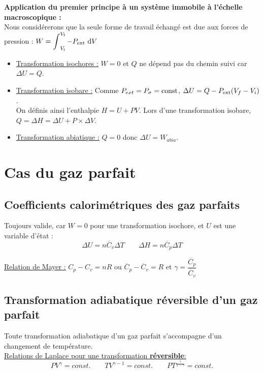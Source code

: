 \documentclass[13pt, twoside, a4paper, french]{report}
\begin{document}
        \textbf{Application du premier principe à un système immobile à l'échelle macroscopique :}
        \vspace{4pt}\\
        Nous considérerons que la seule forme de travail échangé est due aux forces de pression : $W = \operatorname{\displaystyle\int}^{V_\textrm{f}}_{V_\textrm{i}} - P_\textrm{ext}\ \textrm dV$
        \vspace{4pt}
        \begin{itemize}
            \item \underline{Transformation isochores :} $W = 0$ et $Q$ ne dépend pas du chemin suivi car $\Delta U = Q$.
            \vspace{4pt}
            \item \underline{Transformation isobare :} Comme $P_{ext} = P_\sigma = \textrm{const}$, $\Delta U = Q - P_\textrm{ext} (V_f - V_i)$.\\
            On définis ainsi l'enthalpie $H = U + PV$.
            Lors d'une transformation isobare, $Q = \Delta H = \Delta U + P \times \Delta V$.
            \vspace{4pt}
            \item \underline{Transformation abiatique :} $Q = 0$ donc $\Delta U = W_{abia}$.
        \end{itemize}


    \section{Cas du gaz parfait}\label{sec:cas-du-gaz-parfait}

        \subsection{Coefficients calorimétriques des gaz parfaits}\label{subsec:coefficients-calorimetriques-des-gaz-parfaits}

            Toujours valide, car $W = 0$ pour une transformation isochore, et $U$ est une variable d'état :
            \[\Delta U = n \overline{C}_v \Delta T \quad\quad \Delta H = n \overline{C}_p \Delta T\]

            \underline{Relation de Mayer :} $C_p - C_v = nR$ ou $\overline{C}_p - \overline{C}_v= R$ et $\gamma = \dfrac{\overline{C}_p}{\overline{C}_v}$

        \subsection{Transformation adiabatique réversible d'un gaz parfait}\label{subsec:transformation-adiabatique-d'un-gaz-parfait}
            Toute transformation adiabatique d’un gaz parfait s’accompagne d’un changement de température.\\
            \underline{Relations de Laplace pour une transformation \textbf{réversible}:}
            \[P V^\gamma = const. \quad\quad T V^{\gamma - 1} = const. \quad\quad P T^\frac{\gamma}{1 - \gamma} = const. \]
\end{document}

